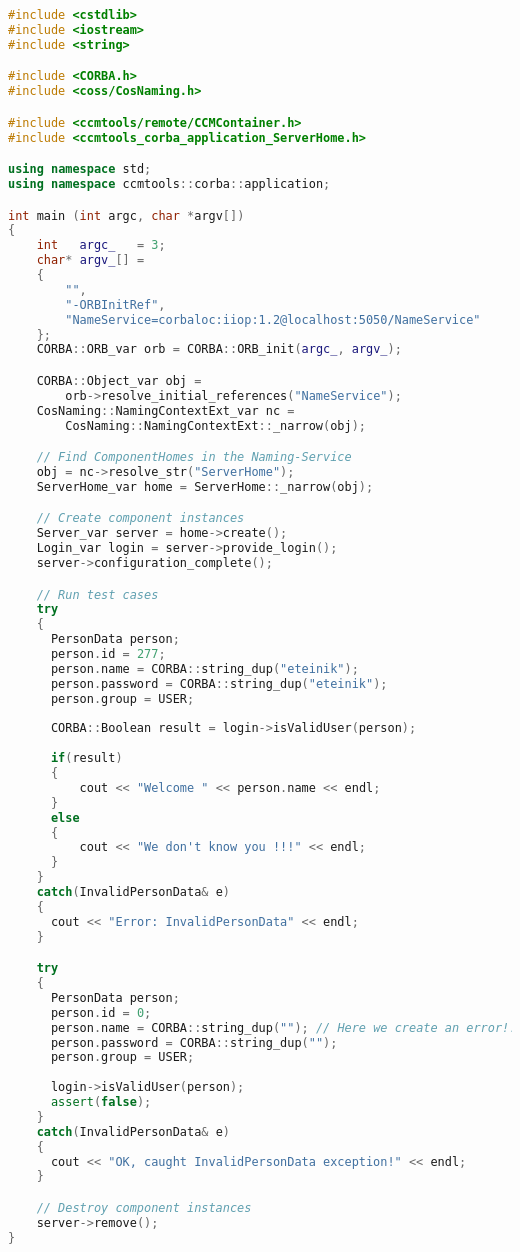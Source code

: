 \begin{footnotesize}
\begin{lstlisting}[language=C++]
#include <cstdlib> 
#include <iostream>
#include <string>

#include <CORBA.h>
#include <coss/CosNaming.h>

#include <ccmtools/remote/CCMContainer.h>
#include <ccmtools_corba_application_ServerHome.h>

using namespace std;
using namespace ccmtools::corba::application;

int main (int argc, char *argv[])
{
    int   argc_   = 3;
    char* argv_[] = 
    { 
        "", 
        "-ORBInitRef", 
        "NameService=corbaloc:iiop:1.2@localhost:5050/NameService"
    };
    CORBA::ORB_var orb = CORBA::ORB_init(argc_, argv_);

    CORBA::Object_var obj = 
        orb->resolve_initial_references("NameService");
    CosNaming::NamingContextExt_var nc = 
        CosNaming::NamingContextExt::_narrow(obj);

    // Find ComponentHomes in the Naming-Service
    obj = nc->resolve_str("ServerHome");
    ServerHome_var home = ServerHome::_narrow(obj);

    // Create component instances
    Server_var server = home->create();
    Login_var login = server->provide_login();
    server->configuration_complete();

	// Run test cases
    try 
    {
      PersonData person;
      person.id = 277;
      person.name = CORBA::string_dup("eteinik");
      person.password = CORBA::string_dup("eteinik");   
      person.group = USER;       
      
      CORBA::Boolean result = login->isValidUser(person);
      
      if(result) 
      {
          cout << "Welcome " << person.name << endl;
      }
      else 
      {
          cout << "We don't know you !!!" << endl;
      }
    }
    catch(InvalidPersonData& e)
    {
      cout << "Error: InvalidPersonData" << endl;	
    }

    try 
    {
      PersonData person;
      person.id = 0;
      person.name = CORBA::string_dup(""); // Here we create an error!!!
      person.password = CORBA::string_dup("");   
      person.group = USER;       
      
      login->isValidUser(person);
      assert(false); 
    }
    catch(InvalidPersonData& e)
    {
      cout << "OK, caught InvalidPersonData exception!" << endl;	
    }

    // Destroy component instances
    server->remove();
}
\end{lstlisting}
\end{footnotesize}

